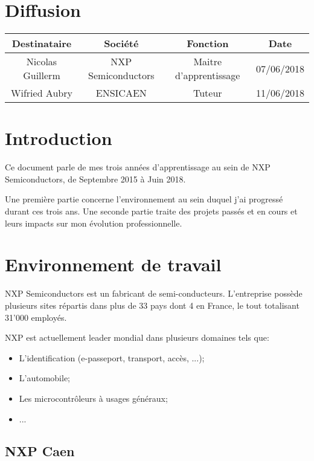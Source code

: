 \documentclass[french,12pt,a4paper,titlepage,openright,openbib]{report}
\begin{document}
{\let \clearpage \relax \chapter*{Diffusion}}
\begin{table}[ht]
	\label{tab:diffusion}
	\centering
	\begin{tabular}{|c|c|c|c|}
		\hline
		{\bf Destinataire} & {\bf Société}      & {\bf Fonction}   		 & {\bf Date}\\
		\hline
		Nicolas Guillerm   & NXP Semiconductors & Maitre d'apprentissage & 07/06/2018 \\
		\hline
		Wifried Aubry      & ENSICAEN 			& Tuteur				 & 11/06/2018 \\
		\hline
	\end{tabular}
\end{table}

\chapter{Introduction}
Ce document parle de mes trois années d'apprentissage au sein de NXP Semiconductors, de Septembre 2015 à Juin 2018.

Une première partie concerne l'environnement au sein duquel j'ai progressé durant ces trois ans.
Une seconde partie traite des projets passés et en cours et leurs impacts sur mon évolution professionnelle.

\chapter{Environnement de travail}
NXP Semiconductors est un fabricant de semi-conducteurs.
L'entreprise possède plusieurs sites répartis dans plus de 33 pays dont 4 en France, le tout totalisant 31'000 employés.

NXP est actuellement leader mondial dans plusieurs domaines tels que:

\begin{itemize}
\item L'identification (e-passeport, transport, accès, ...);
\item L'automobile;
\item Les microcontrôleurs à usages généraux;
\item ...
\end{itemize}

\section{NXP Caen}
\end{document}
